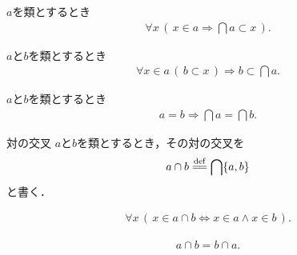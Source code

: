 	\begin{screen}
		\begin{thm}[交叉は全ての要素に含まれる]
		\label{thm:intersection_is_obtained_by_all_elements}
			$a$を類とするとき
			\begin{align}
				\forall x\, (\, x \in a \Longrightarrow \bigcap a \subset x\, ).
			\end{align}
		\end{thm}
	\end{screen}
	
	\begin{screen}
		\begin{thm}[全ての要素に共通して含まれる類は交叉にも含まれる]
		\label{thm:if_obtained_by_all_elements_then_obtained_by_intersection}
			$a$と$b$を類とするとき
			\begin{align}
				\forall x \in a\, (\, b \subset x\, ) \Longrightarrow b \subset \bigcap a.
			\end{align}
		\end{thm}
	\end{screen}
	
	\begin{screen}
		\begin{thm}[等しい類の交叉は等しい]\label{thm:intersections_of_equal_classes_are_equal}
			$a$と$b$を類とするとき
			\begin{align}
				a = b \Longrightarrow \bigcap a = \bigcap b.
			\end{align}
		\end{thm}
	\end{screen}
	
	\begin{itembox}[l]{対の交叉}
		$a$と$b$を類とするとき，その対の交叉を
		\begin{align}
			a \cap b \defeq \bigcap \{a,b\}
		\end{align}
		と書く．
	\end{itembox}
	
	\begin{screen}
		\begin{thm}
			\begin{align}
				\forall x\, (\, x \in a \cap b \Longleftrightarrow x \in a \wedge x \in b\, ).
			\end{align}
		\end{thm}
	\end{screen}
	
	\begin{screen}
		\begin{thm}[交叉の可換律]
			\begin{align}
				a \cap b = b \cap a.
			\end{align}
		\end{thm}
	\end{screen}
	
